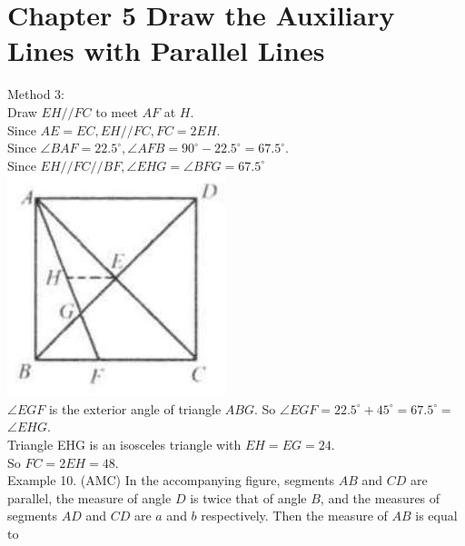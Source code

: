 \documentclass[10pt]{article}
\begin{document}
\section*{Chapter 5 Draw the Auxiliary Lines with Parallel Lines}
Method 3:\\
Draw \(E H / / F C\) to meet \(A F\) at \(H\).\\
Since \(A E=E C, E H / / F C, F C=2 E H\).\\
Since \(\angle B A F=22.5^{\circ}, \angle A F B=90^{\circ}-22.5^{\circ}=67.5^{\circ}\).\\
Since \(E H / / F C / / B F, \angle E H G=\angle B F G=67.5^{\circ}\)\\
\includegraphics[max width=\textwidth, center]{2025_04_17_97bc1f7e44d93c271a88g-110}\\
\(\angle E G F\) is the exterior angle of triangle \(A B G\). So \(\angle E G F=22.5^{\circ}+45^{\circ}=67.5^{\circ}=\) \(\angle E H G\).\\
Triangle EHG is an isosceles triangle with \(E H=E G=24\).\\
So \(F C=2 E H=48\).\\
Example 10. (AMC) In the accompanying figure, segments \(A B\) and \(C D\) are parallel, the measure of angle \(D\) is twice that of angle \(B\), and the measures of segments \(A D\) and \(C D\) are \(a\) and \(b\) respectively. Then the measure of \(A B\) is equal to\\
\end{document}
